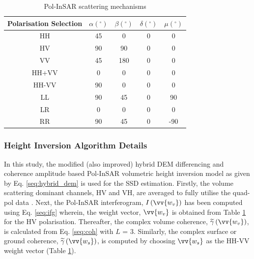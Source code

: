 \documentclass[review]{elsarticle}
\numberwithin{equation}{section}
\numberwithin{figure}{section}
\numberwithin{table}{section}
\begin{document}
\begin{table}[ht]
\centering
\caption{Pol-InSAR scattering mechanisms \citep{Cloude2005}}
\label{table:1}
\begin{tabular}{c c c c c}
\hline
\textbf{Polarisation Selection} & \boldmath$\alpha(^\circ)$   & \boldmath$\beta(^\circ)$     & \boldmath$\delta(^\circ)$ & \boldmath$\mu(^\circ)$       \\ \hline
HH                     & 45 & 0   & 0          & 0   \\ 
HV                     & 90 & 90  & 0          & 0   \\ 
VV                     & 45 & 180 & 0          & 0   \\ 
HH+VV                  & 0  & 0   & 0          & 0   \\ 
HH-VV                  & 90 & 0   & 0          & 0   \\ 
LL                     & 90 & 45  & 0          & 90  \\ 
LR                     & 0  & 0   & 0           & 0   \\ 
RR                     & 90 & 45  & 0          & -90 \\ \hline
\end{tabular}
\end{table}

\subsubsection{Height Inversion Algorithm Details}
In this study, the modified (also improved) hybrid DEM differencing and coherence amplitude based Pol-InSAR volumetric height inversion model as given by Eq. \eqref{seq:hybrid_dem} is used for the SSD estimation. Firstly, the volume scattering dominant channels, HV and VH, are averaged to fully utilise the quad-pol data \citep{Cloude2005}. Next, the Pol-InSAR interferogram, $I\left(\vv{w_v}\right)$ has been computed using Eq. \eqref{seq:ifg} wherein, the weight vector, $\vv{w_v}$ is obtained from Table \ref{table:1} for the HV polarisation. Thereafter, the complex volume coherence, $\widetilde{\gamma}\left(\vv{w_v}\right)$, is calculated from Eq. \eqref{seq:coh} with $L$ = 3. Similarly, the complex surface or ground coherence, $\widetilde{\gamma}\left(\vv{w_s}\right)$, is computed by choosing $\vv{w_s}$ as the HH-VV weight vector (Table \ref{table:1}).  
\end{document}
